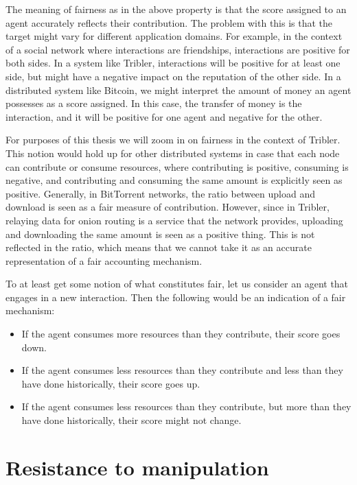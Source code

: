 \documentclass[a4paper,11pt]{book}
\newcommand\nicetohave[1]{\textcolor{orange}{TODO: #1}}
\theoremstyle{definition}
\begin{document}
The meaning of fairness as in the above property is that the score assigned to an agent
accurately reflects their contribution. The problem with this is that the target might
vary for different application domains. For example, in the context of a social
network where interactions are friendships, interactions are positive for both sides.
In a system like Tribler, interactions will be positive for at least one side, but
might have a negative impact on the reputation of the other side. In a distributed system like Bitcoin,
we might interpret the amount of money an agent possesses as a score assigned. In
this case, the transfer of money is the interaction, and it will be positive for one
agent and negative for the other.

For purposes of this thesis we will zoom in on fairness in the context of Tribler.
This notion would hold up for other distributed systems in case that each node
can contribute or consume resources, where contributing is positive, consuming
is negative, and contributing and consuming the same amount is explicitly seen as positive.
Generally, in BitTorrent networks, the ratio between upload and download is seen
as a fair measure of contribution. However, since in Tribler, relaying data for onion
routing is a service that the network provides, uploading and downloading the same
amount is seen as a positive thing. This is not reflected in the ratio, which
means that we cannot take it as an accurate representation of a fair accounting mechanism.

To at least get some notion of what constitutes fair, let us consider an agent that
engages in a new interaction. Then the following would be an indication of a fair mechanism:

\begin{itemize}
    \item If the agent consumes more resources than they contribute, their score goes down.
    \item If the agent consumes less resources than they contribute and less than they have
        done historically, their score goes up.
     \item If the agent consumes less resources than they contribute, but more than they have
        done historically, their score might not change.
\end{itemize}


\section{Resistance to manipulation}
\end{document}
